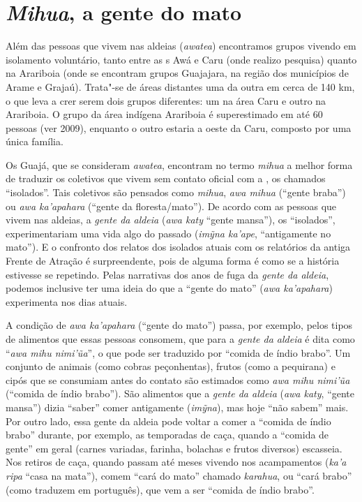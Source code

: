 \section{\emph{Mihua}, a gente do mato}

Além das pessoas que vivem nas aldeias (\emph{awatea}) encontramos
grupos vivendo em isolamento voluntário, tanto entre as s Awá e Caru
(onde realizo pesquisa) quanto na  Arariboia (onde se encontram grupos
Guajajara, na região dos municípios de Arame e Grajaú). Trata"-se de
áreas distantes uma da outra em cerca de 140 km, o que leva a crer serem
dois grupos diferentes: um na área Caru e outro na Arariboia. O grupo da
área indígena Arariboia é superestimado em até 60 pessoas (ver 
2009), enquanto o outro estaria a oeste da Caru, composto por uma única
família.

Os Guajá, que se consideram \emph{awatea}, encontram no termo
\emph{mihua} a melhor forma de traduzir os coletivos que vivem sem
contato oficial com a , os chamados ``isolados''. Tais coletivos
são pensados como \emph{mihua}, \emph{awa mihua} (``gente braba'') ou
\emph{awa ka'apahara} (``gente da floresta/mato''). De acordo com as
pessoas que vivem nas aldeias, a \emph{gente da aldeia} (\emph{awa katy}
``gente mansa''), os ``isolados'', experimentariam uma vida algo do
passado (\emph{imỹna ka'ape}, ``antigamente no mato''). E o confronto dos
relatos dos isolados atuais com os relatórios da antiga Frente de
Atração é surpreendente, pois de alguma forma é como se a história
estivesse se repetindo. Pelas narrativas dos anos de fuga da \emph{gente
da aldeia}, podemos inclusive ter uma ideia do que a ``gente do mato''
(\emph{awa ka'apahara}) experimenta nos dias atuais.

A condição de \emph{awa ka'apahara} (``gente do mato'') passa, por
exemplo, pelos tipos de alimentos que essas pessoas consomem, que para a
\emph{gente da aldeia} é dita como ``\emph{awa mihu nimi'ũa}'', o que pode
ser traduzido por ``comida de índio brabo''. Um conjunto de animais (como
cobras peçonhentas), frutos (como a pequirana) e cipós que se consumiam
antes do contato são estimados como \emph{awa mihu nimi'ũa} (``comida de
índio brabo''). São alimentos que a \emph{gente da aldeia} (\emph{awa
katy}, ``gente mansa'') dizia ``saber'' comer antigamente (\emph{imỹna}),
mas hoje ``não sabem'' mais. Por outro lado, essa gente da aldeia pode
voltar a comer a ``comida de índio brabo'' durante, por exemplo, as
temporadas de caça, quando a ``comida de gente'' em geral (carnes
variadas, farinha, bolachas e frutos diversos) escasseia. Nos retiros de
caça, quando passam até meses vivendo nos acampamentos (\emph{ka'a ripa}
``casa na mata''), comem ``cará do mato'' chamado \emph{karahua}, ou ``cará
brabo'' (como traduzem em português), que vem a ser ``comida de índio
brabo''.

